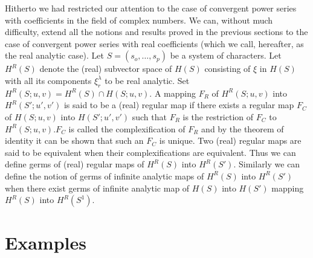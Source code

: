 Hitherto we had restricted our attention to the case of convergent
power series with coefficients in the field of complex numbers. We
can,  without much difficulty,  extend all the notions and results
proved in the previous sections to the case of convergent power series
with real coefficients (which we call,  hereafter,  as the real
analytic case). Let $S = (s_o,  \ldots,  s_p)$ be a system of
characters. Let $H^R(S)$ denote the (real) subvector space of $H(S)$
consisting of $\xi$ in $H(S)$ with all its components $\xi^\lambda_r$
to be real analytic. Set $H^R(S; u,  v) = H^R(S) \cap H(S; u,  v)$. A
mapping $F_R$ of $H^R(S; u,  v)$ into $H^R(S'; u',  v')$ is said to be
a (real) regular map if there exists a regular map $F_C$ of $H(S; u,
v)$ into $H(S'; u',  v')$ such that $F_R$ is the restriction of $F_C$
to $H^R(S; u, v). F_C $ is called the complexification of $F_R$ and by
the theorem of identity it can be shown that such an $F_C$ is
unique. Two (real) regular maps are said to be equivalent when their
complexifications are equivalent. Thus we can define germs of (real)
regular maps of $H^R(S)$ into $H^R(S')$. Similarly we can define the
notion of germs of infinite analytic maps of $H^R(S)$ into $H^R(S')$
when there exist germs of infinite analytic map of $H(S)$ into $H(S')$
mapping $H^R(S)$ into $H^R(S^1)$.\pageoriginale 

\section{Examples}\label{chap1:sec1.5}%



